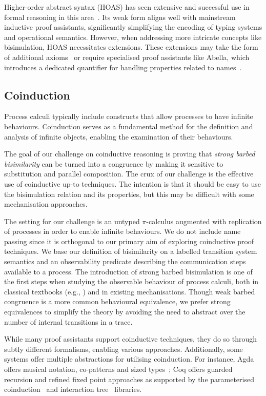 \documentclass[runningheads]{llncs}
\begin{document}
Higher-order abstract syntax (HOAS) has seen extensive and successful
use in formal reasoning in this area~\cite{Despeyroux2000,Honsell2001,Tiu2010,ChaudhuriCM15}. Its
weak form aligns well with mainstream inductive proof assistants,
significantly simplifying the encoding of typing systems and operational
semantics. However, when addressing more intricate concepts like
bisimulation, HOAS necessitates extensions. These extensions may take
the form of additional axioms~\cite{Honsell2001} or require specialised proof assistants
like Abella, which introduces a dedicated quantifier for handling
properties related to names~\cite{GacekMN11}.

\subsection{Coinduction}

Process calculi typically include constructs that allow processes to
have infinite behaviours.  Coinduction serves as a fundamental method
for the definition and analysis of infinite objects, enabling the
examination of their behaviours.

The goal of our challenge on coinductive reasoning is proving that
\emph{strong barbed bisimilarity} can be turned into a congruence by making
it sensitive to substitution and parallel composition. The crux of our
challenge is the effective use of coinductive up-to techniques.  The
intention is that it should be easy to use the bisimulation relation
and its properties, but this may be difficult with some mechanisation
approaches.

The setting for our challenge is an untyped \(\pi\)-calculus augmented with
replication of processes in order to enable infinite behaviours.  We do not
include name passing since it is orthogonal to our
primary aim of exploring coinductive proof techniques.  We base our
definition of bisimilarity on a labelled transition system semantics
and an observability predicate describing the communication steps
available to a process.  The introduction of strong barbed
bisimulation is one of the first steps when studying the observable
behaviour of process calculi, both in classical textbooks (e.g.,
\cite{picalcbook}) and in existing mechanisations.  Though weak barbed
congruence is a more common behavioural equivalence, we prefer strong
equivalences to simplify the theory by avoiding the need to abstract
over the number of internal transitions in a trace.

While many proof assistants support coinductive techniques, they do so
through subtly different formalisms, enabling various approaches.
Additionally, some systems offer multiple abstractions for utilising coinduction.
For instance, Agda offers musical notation, co-patterns and sized types~\cite{Abel2013};
Coq offers guarded recursion and refined fixed point approaches as supported by the parameterised coinduction~\cite{Hur2013}
and interaction tree~\cite{Xia2019} libraries.
\end{document}
